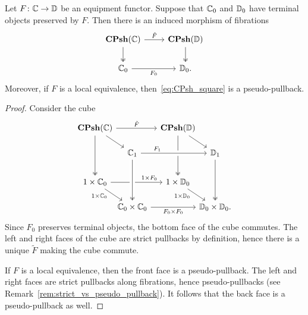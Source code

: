 \documentclass[11pt,oneside,article]{memoir}
\begin{document}
\begin{lemma}
      \label{lem:Psh_pullback}
   Let $F\colon\mathbb{C}\to\mathbb{D}$ be an equipment functor. Suppose that $\mathbb{C}_0$ and
   $\mathbb{D}_0$ have terminal objects preserved by $F$. Then there is an induced
   morphism of fibrations
   \begin{equation} \begin{tikzcd}
         \label{eq:CPsh_square}
      \CPsh(\dcat{C}) \ar[r,"\tilde{F}"] \ar[d,two heads] %
         & \CPsh(\dcat{D}) \ar[d,two heads] \\
      \dcat{C}_0 \ar[r,"F_0"']
         & \dcat{D}_0.
   \end{tikzcd} \end{equation}
   Moreover, if $F$ is a local equivalence, then~\eqref{eq:CPsh_square} is a pseudo-pullback.
\end{lemma}
\begin{proof}
   Consider the cube
   \[ \begin{tikzcd}[row sep={35,between origins}, column sep={55,between origins}]
      \CPsh(\dcat{C}) \ar[rr,"\tilde{F}"] \ar[dr] \ar[dd,two heads]
      &[-10] & \CPsh(\dcat{D}) \ar[dd,two heads] \ar[dr] &[-10] \\[-5]
      & \dcat{C}_1 \ar[rr,crossing over,"F_1" near start]
         && \dcat{D}_1 \ar[dd,two heads] \\
      1\times\dcat{C}_0 \ar[rr,"1\times F_0" pos=.75]
            \ar[dr,"1\times\dcat{C}_0"' {pos=.25,inner sep=2pt}]
         && 1\times\dcat{D}_0 \ar[dr,"1\times\dcat{D}_0"' {pos=.25,inner sep=2pt}] & \\[-5]
      & \dcat{C}_0\times\dcat{C}_0 \ar[rr,"F_0\times F_0"']
            \ar[from=uu,crossing over,two heads]
         && \dcat{D}_0\times\dcat{D}_0.
   \end{tikzcd} \]
   Since $F_0$ preserves terminal objects, the bottom face of the cube commutes. The left and right faces of
   the cube are strict pullbacks by definition, hence there is a unique $\tilde{F}$ making the cube commute.

   If $F$ is a local equivalence, then the front face is a pseudo-pullback. The left and right faces
   are strict pullbacks along fibrations, hence pseudo-pullbacks (see Remark~\ref{rem:strict_vs_pseudo_pullback}). It follows that the
   back face is a pseudo-pullback as well.
\end{proof}
\end{document}
